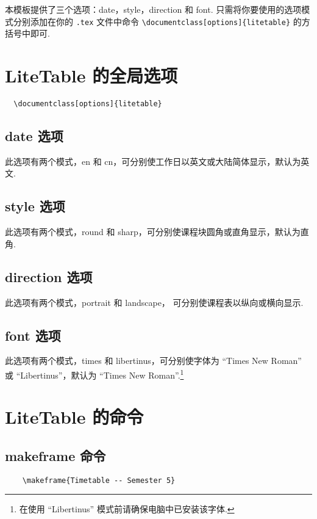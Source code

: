 \documentclass[11pt]{article}
\def\pkg#1{\texorpdfstring{\textcolor{pkgcolor}{\textsf{#1}}}{“#1”}}
\def\mode#1{\texorpdfstring{\textcolor{moducolor}{\textsf{#1}}}{“#1”}}
\def\cmd#1{\texorpdfstring{\textcolor{cmdcolor}{\textsf{#1}}}{“#1”}}
\begin{document}
本模板提供了三个选项：\mode{date}，\mode{style}，\mode{direction} 和 \mode{font}. 只需将你要使用的选项模式分别添加在你的 \verb|.tex| 文件中命令 \verb|\documentclass[options]{litetable}| 的方括号中即可.

\newpage
\section{\pkg{LiteTable} 的全局选项}
\begin{verbatim}
  \documentclass[options]{litetable}
\end{verbatim}
\subsection{\mode{date} 选项}
此选项有两个模式，\mode{en} 和 \mode{cn}，可分别使工作日以英文或大陆简体显示，默认为英文.

\subsection{\mode{style} 选项}
此选项有两个模式，\mode{round} 和 \mode{sharp}，可分别使课程块圆角或直角显示，默认为直角.

\subsection{\mode{direction} 选项}
此选项有两个模式，\mode{portrait} 和 \mode{landscape}， 可分别使课程表以纵向或横向显示.

\subsection{\mode{font} 选项}
此选项有两个模式，\mode{times} 和 \mode{libertinus}，可分别使字体为 ``Times New Roman'' 或 ``Libertinus''，默认为 ``Times New Roman''.\footnote{在使用 ``Libertinus'' 模式前请确保电脑中已安装该字体.}

\section{\pkg{LiteTable} 的命令}

\subsection{\cmd{makeframe} 命令}
\begin{verbatim}
    \makeframe{Timetable -- Semester 5}
\end{verbatim}
\end{document}
